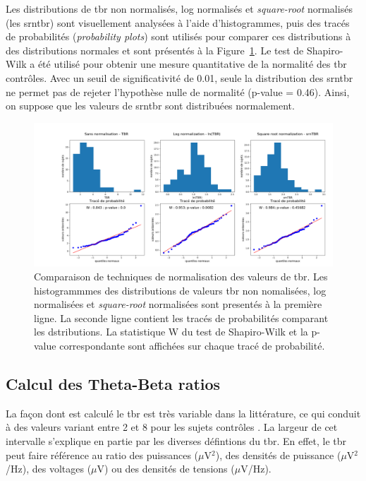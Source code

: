 Les distributions de \gls{tbr} non normalisés, log normalisés et \textit{square-root} normalisés (les \gls{srntbr}) sont visuellement analysées à l'aide 
d'histogrammes, puis des tracés de probabilités (\textit{probability plots}) sont utilisés pour comparer ces distributions à des distributions normales 
et sont présentés à la Figure~\ref{Figure:tbr_normalization}. Le test de Shapiro-Wilk \citep{Shapiro1965} a été utilisé pour obtenir une mesure quantitative 
de la normalité des \gls{tbr} contrôles. Avec un seuil de significativité de 0.01, seule la distribution des \gls{srntbr} ne permet pas de rejeter l'hypothèse
nulle de normalité (p-value = 0.46). Ainsi, on suppose que les valeurs de \gls{srntbr} sont distribuées normalement. 

\begin{figure}[h!]
  \centering
	\includegraphics[width=1.0\linewidth]{figures/chapter-4/tbr-normalization} 
  \caption{Comparaison de techniques de normalisation des valeurs de \gls{tbr}. Les histogrammmes des distributions de valeurs \gls{tbr} non nomalisées,
	log normalisées et \textit{square-root} normalisées sont presentés à la première ligne. La seconde ligne contient les tracés de probabilités comparant les
	dstributions. La statistique W du test de Shapiro-Wilk et la p-value correspondante sont affichées sur chaque tracé de probabilité.}
  \label{Figure:tbr_normalization}
\end{figure}

\subsection{Calcul des Theta-Beta ratios}

La façon dont est calculé le \gls{tbr} est très variable dans la littérature, ce qui conduit à des valeurs variant entre 2 et 8 pour les sujets contrôles \citep{Arns2012,
Schutte2017}. La largeur de cet intervalle s'explique en partie par les diverses défintions du \gls{tbr}. En effet, le \gls{tbr} peut faire référence au ratio
des puissances ($\mu$V$^2$), des densités de puissance ($\mu$V$^2$/Hz), des voltages ($\mu$V) ou des densités de tensions ($\mu$V/Hz). 


